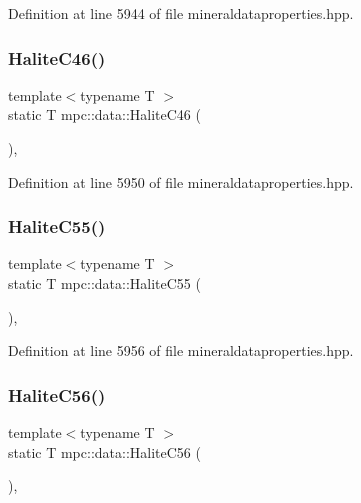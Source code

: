 Definition at line 5944 of file mineraldataproperties.\+hpp.

\mbox{\label{namespacempc_1_1data_a71d20604dc0309add7723694a49ce6c1}} 
\subsubsection{\texorpdfstring{Halite\+C46()}{HaliteC46()}}
{\footnotesize\ttfamily template$<$typename T $>$ \\
static T mpc\+::data\+::\+Halite\+C46 (\begin{DoxyParamCaption}{ }\end{DoxyParamCaption})\hspace{0.3cm}{\ttfamily [inline]}, {\ttfamily [static]}}



Definition at line 5950 of file mineraldataproperties.\+hpp.

\mbox{\label{namespacempc_1_1data_a43eda237165fb032e3519be2ec28c48c}} 
\subsubsection{\texorpdfstring{Halite\+C55()}{HaliteC55()}}
{\footnotesize\ttfamily template$<$typename T $>$ \\
static T mpc\+::data\+::\+Halite\+C55 (\begin{DoxyParamCaption}{ }\end{DoxyParamCaption})\hspace{0.3cm}{\ttfamily [inline]}, {\ttfamily [static]}}



Definition at line 5956 of file mineraldataproperties.\+hpp.

\mbox{\label{namespacempc_1_1data_ad793da2c59a42c660a28400365a109ea}} 
\subsubsection{\texorpdfstring{Halite\+C56()}{HaliteC56()}}
{\footnotesize\ttfamily template$<$typename T $>$ \\
static T mpc\+::data\+::\+Halite\+C56 (\begin{DoxyParamCaption}{ }\end{DoxyParamCaption})\hspace{0.3cm}{\ttfamily [inline]}, {\ttfamily [static]}}



